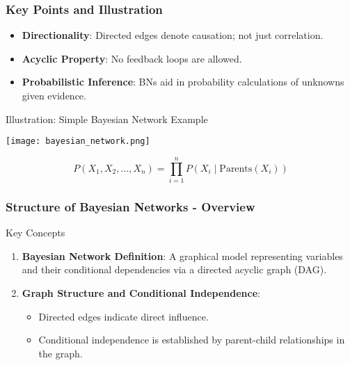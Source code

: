 \documentclass[aspectratio=169]{beamer}
\begin{document}
\begin{frame}[fragile]
    \frametitle{Key Points and Illustration}
    \begin{itemize}
        \item \textbf{Directionality}: Directed edges denote causation; not just correlation.
        \item \textbf{Acyclic Property}: No feedback loops are allowed.
        \item \textbf{Probabilistic Inference}: BNs aid in probability calculations of unknowns given evidence.
    \end{itemize}

    \begin{block}{Illustration: Simple Bayesian Network Example}
        \begin{center}
            \texttt{[image: bayesian\_network.png]} %
        \end{center}
    \end{block}

    \begin{equation}
        P(X_1, X_2, \ldots, X_n) = \prod_{i=1}^{n} P(X_i \mid \text{Parents}(X_i))
    \end{equation}
\end{frame}

\begin{frame}[fragile]
    \frametitle{Structure of Bayesian Networks - Overview}
    \begin{block}{Key Concepts}
        \begin{enumerate}
            \item \textbf{Bayesian Network Definition}: A graphical model representing variables and their conditional dependencies via a directed acyclic graph (DAG).
            \item \textbf{Graph Structure and Conditional Independence}:
                \begin{itemize}
                    \item Directed edges indicate direct influence.
                    \item Conditional independence is established by parent-child relationships in the graph.
                \end{itemize}
        \end{enumerate}
    \end{block}
\end{frame}
\end{document}
